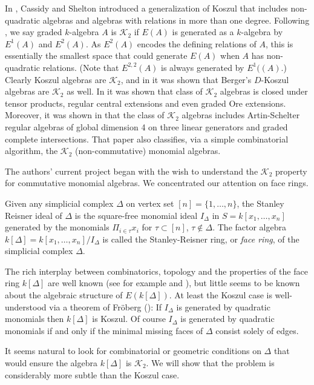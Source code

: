 \documentclass[11pt,righttag]{amsart}
\begin{document}
In \cite{CS}, Cassidy and Shelton introduced a generalization of Koszul that includes  non-quadratic algebras and algebras with relations in more than one degree.  Following \cite{CS}, we say graded $k$-algebra $A$ is ${{\mathcal K}}_2$ if $E(A)$ is generated as a $k$-algebra by $E^1(A)$ and $E^2(A)$.  As $E^2(A)$ encodes the defining relations of $A$, this is essentially the smallest space that could generate $E(A)$ when $A$ has non-quadratic relations. (Note that $E^{2,2}(A)$ is always generated by $E^1((A)$.)  Clearly Koszul algebras are ${{\mathcal K}}_2$, and in \cite{G} it was shown that Berger's $D$-Koszul algebras are ${{\mathcal K}}_2$ as well. In \cite{CS} it was shown that class of ${{\mathcal K}}_2$ algebras is closed under tensor products, regular central extensions and even graded Ore extensions. Moreover,  it was shown in \cite{CS} that the class of ${{\mathcal K}}_2$ algebras includes Artin-Schelter regular algebras of global dimension 4 on three linear generators and graded complete intersections.  That paper also classifies, via a simple combinatorial algorithm, the ${{\mathcal K}}_2$ (non-commutative) monomial algebras.

The authors' current project began with the wish to understand the ${{\mathcal K}}_2$ property for commutative monomial algebras.  We concentrated our attention on face rings.

Given any simplicial complex ${\Delta}$ on vertex set $[n]=\{1, \ldots, n\}$, the Stanley Reisner ideal of ${\Delta}$ is the square-free monomial ideal $I_{\Delta}$ in 
$S = k[x_1,\ldots, x_n]$ generated by the monomials $\Pi_{i\in \tau} x_i$ for $\tau\subset [n]$, $\tau\notin{\Delta}$. The factor algebra $k[{\Delta}]=k[x_1,\ldots,x_n]/I_{\Delta}$ is called the Stanley-Reisner ring, or \emph{face ring}, of the simplicial complex ${\Delta}$.

The rich interplay between combinatorics, topology and the properties of the face ring $k[{\Delta}]$ are well known (see for example \cite{MS} and \cite{Stanley}), but little seems to be known about the algebraic structure of $E(k[{\Delta}])$. At least the Koszul case is well-understood via a theorem of  Fr\"{o}berg (\cite{Fro}): If $I_{\Delta}$ is generated by quadratic monomials then $k[{\Delta}]$ is Koszul.  Of course $I_{\Delta}$ is generated by quadratic monomials if and only if the minimal missing faces of ${\Delta}$ consist solely of edges. 

It seems natural to look for combinatorial or geometric conditions on ${\Delta}$ that would ensure the algebra $k[{\Delta}]$ is ${{\mathcal K}}_2$.  We will show that the problem is considerably more subtle than the Koszul case. 
\end{document}
